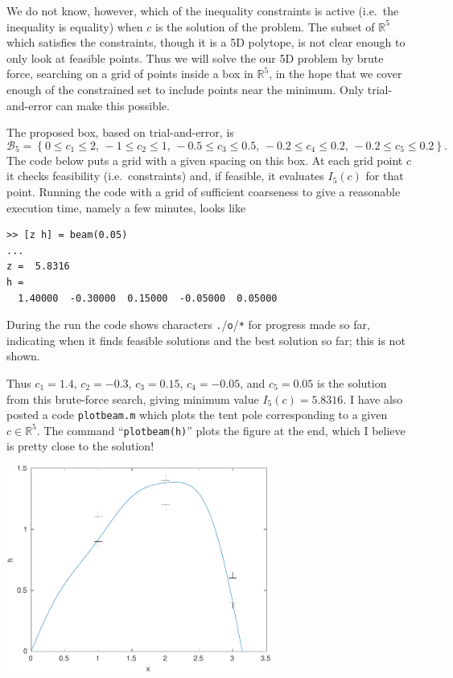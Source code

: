 \documentclass[11pt]{amsart}
\newcommand{\mfile}[2]{\bigskip
\begin{quote}
\VerbatimInput[frame=single,framesep=3mm,label=\fbox{\normalsize \textsl{\,#2\,}},fontfamily=courier,fontsize=\scriptsize]{#1}
\end{quote}
}
\newcommand{\RR}{\mathbb{R}}
\begin{document}
We do not know, however, which of the inequality constraints is active (i.e.~the inequality is equality) when $c$ is the solution of the problem.  The subset of $\RR^5$ which satisfies the constraints, though it is a 5D polytope, is not clear enough to only look at feasible points.  Thus we will solve the our 5D problem by brute force, searching on a grid of points inside a box in $\RR^5$, in the hope that we cover enough of the constrained set to include points near the minimum.  Only trial-and-error can make this possible.

The proposed box, based on trial-and-error, is
	$$\mathcal{B}_5 = \left\{0 \le c_1 \le 2, \,
	                         -1 \le c_2 \le 1, \,
	                         -0.5 \le c_3 \le 0.5, \,
	                         -0.2 \le c_4 \le 0.2, \,
	                         -0.2 \le c_5 \le 0.2\right\}.$$
The code below puts a grid with a given spacing on this box.  At each grid point $c$ it checks feasibility (i.e.~constraints) and, if feasible, it evaluates $I_5(c)$ for that point.  Running the code with a grid of sufficient coarseness to give a reasonable execution time, namely a few minutes, looks like

\medskip
\begin{Verbatim}[fontfamily=courier,fontsize=\scriptsize]
>> [z h] = beam(0.05)
...
z =  5.8316
h =
  1.40000  -0.30000  0.15000  -0.05000  0.05000
\end{Verbatim}

\medskip
\noindent During the run the code shows characters \texttt{.}/\texttt{o}/\texttt{*} for progress made so far, indicating when it finds feasible solutions and the best solution so far; this is not shown.

Thus $c_1=1.4$, $c_2=-0.3$, $c_3=0.15$, $c_4=-0.05$, and $c_5=0.05$ is the solution from this brute-force search, giving minimum value $I_5(c)=5.8316$.  I have also posted a code \texttt{plotbeam.m} which plots the tent pole corresponding to a given $c\in \RR^5$.  The command ``\texttt{plotbeam(h)}'' plots the figure at the end, which I believe is pretty close to the solution!

\bigskip

\mfile{matlab/beam.m}{beam.m}

\bigskip
\begin{center}
\includegraphics[width=0.65\textwidth]{beam-soln-gates}
\end{center}
\end{document}
